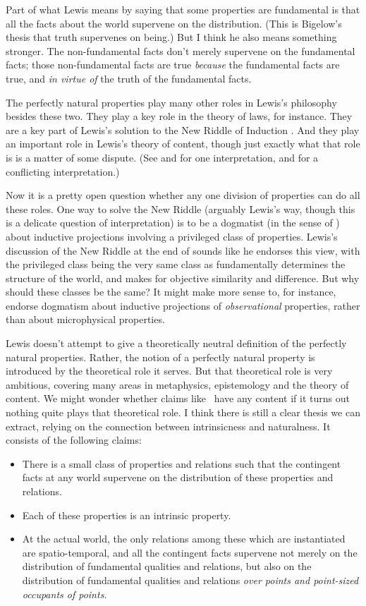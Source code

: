 Part of what Lewis means by saying that some properties are fundamental is that all the facts about the world supervene on the distribution. (This is Bigelow's thesis that truth supervenes on being.) But I think he also means something stronger. The non-fundamental facts don't merely supervene on the fundamental facts; those non-fundamental facts are true \textit{because} the fundamental facts are true, and \textit{in virtue of} the truth of the fundamental facts.

The perfectly natural properties play many other roles in Lewis's philosophy besides these two. They play a key role in the theory of laws, for instance. They are a key part of Lewis's solution to the New Riddle of Induction \citep{Goodman1955}. And they play an important role in Lewis's theory of content, though just exactly what that role is is a matter of some dispute. (See \citet{Sider2001-SIDCOP} and \citet{Weatherson2003-WEAWGA} for one interpretation, and \citet{Schwarz2009} for a conflicting interpretation.)

Now it is a pretty open question whether any one division of properties can do all these roles. One way to solve the New Riddle (arguably Lewis's way, though this is a delicate question of interpretation) is to be a dogmatist (in the sense of \citet{Pryor2000}) about inductive projections involving a privileged class of properties. Lewis's discussion of the New Riddle at the end of \citet{Lewis1983e} sounds like he endorses this view, with the privileged class being the very same class as fundamentally determines the structure of the world, and makes for objective similarity and difference. But why should these classes be the same? It might make more sense to, for instance, endorse dogmatism about inductive projections of \textit{observational} properties, rather than about microphysical properties.

Lewis doesn't attempt to give a theoretically neutral definition of the perfectly natural properties. Rather, the notion of a perfectly natural property is introduced by the theoretical role it serves. But that theoretical role is very ambitious, covering many areas in metaphysics, epistemology and the theory of content. We might wonder whether claims like \HS\ have any content if it turns out nothing quite plays that theoretical role. I think there is still a clear thesis we can extract, relying on the connection between intrinsicness and naturalness. It consists of the following claims:

\begin{itemize}
\item There is a small class of properties and relations such that the contingent facts at any world supervene on the distribution of these properties and relations.
\item Each of these properties is an intrinsic property.
\item At the actual world, the only relations among these which are instantiated are spatio-temporal, and all the contingent facts supervene not merely on the distribution of fundamental qualities and relations, but also on the distribution of fundamental qualities and relations \textit{over points and point-sized occupants of points}.
\end{itemize}

